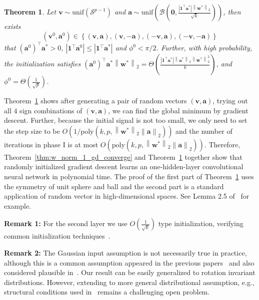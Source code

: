 \documentclass{article}
\newcommand{\poly}{\mathrm{poly}}
\newcommand{\unif}{\mathrm{unif}}
\newcommand{\firstlayer}{w}
\newcommand{\firstlayerWN}{v}
\newcommand{\secondlayer}{a}
\newcommand{\vect}[1]{\mathbf{#1}}
\newcommand{\norm}[1]{\left\|#1\right\|}
\newcommand{\abs}[1]{\left|#1\right|}
\newtheorem{thm}{Theorem}[section]
\begin{document}
\begin{thm}\label{thm:init}
Let $\vect{\firstlayerWN} \sim \unif\left(\mathcal{S}^{p-1}\right)$ and $\vect{\secondlayer} \sim \unif\left( \mathcal{B}\left(\vect{0},\frac{\abs{\vect{1}^\top\vect{\secondlayer}^*}\norm{\vect{\firstlayer}^*}_2}{\sqrt{k}}\right)\right)$, then exists \[\left(\vect{\firstlayerWN}^0,\vect{\secondlayer}^0\right) \in \left\{\left(\vect{\firstlayerWN},\vect{\secondlayer}\right), \left(\vect{\firstlayerWN},-\vect{\secondlayer}\right), \left(-\vect{\firstlayerWN},\vect{\secondlayer}\right), \left(-\vect{\firstlayerWN},-\vect{\secondlayer}\right)  \right\}\] that $\left(\vect{\secondlayer}^0\right)^\top \vect{\secondlayer}^* > 0$, $\abs{ \vect{1}^\top\vect{\secondlayer}^0}\le \abs{\vect{1}^\top \vect{\secondlayer}^*}$ and $\phi^0 <\pi/2$.
Further, with high probability, the initialization satisfies $\left(\vect{\secondlayer}^0\right)^\top \vect{\secondlayer}^*\norm{\vect{\firstlayer}^*}_2 = \Theta\left(\frac{\abs{\vect{1}^\top\vect{\secondlayer}^*}\norm{\vect{\secondlayer}^*}_2\norm{\vect{\firstlayer}^*}_2^2}{k}\right)$, and $\phi^0 = \Theta\left(\frac{1}{\sqrt{p}}\right)$.
\end{thm}
Theorem~\ref{thm:init} shows after generating a pair of random vectors $(\vect{\firstlayerWN},\vect{\secondlayer})$, trying out all $4$ sign combinations of $(\vect{\firstlayerWN},\vect{\secondlayer})$, we can find the global minimum by gradient descent.
Further, because the initial signal is not too small, we only need to set the step size to be $O(1/\poly(k,p,\norm{\vect{\firstlayer}^*}_2\norm{\vect{\secondlayer}}_2))$ and the number of iterations in phase I is at most $O(\poly(k,p,\norm{\vect{\firstlayer}^*}_2\norm{\vect{\secondlayer}}_2))$.
Therefore, Theorem~\ref{thm:w_norm_1_gd_converge} and Theorem~\ref{thm:init} together show that randomly initialized gradient descent learns an one-hidden-layer convolutional neural network in polynomial time.
The proof of the first part of Theorem~\ref{thm:init} uses the symmetry of unit sphere and ball and the second part is a standard application of random vector in high-dimensional spaces.
See Lemma 2.5 of~\citep{hardt2014noisy} for example.

\noindent\textbf{Remark 1:} For the second layer we use $O\left(\frac{1}{\sqrt{k}}\right)$ type initialization, verifying common initialization techniques~\citep{glorot2010understanding,he2015delving,lecun1998efficient}.

\noindent\textbf{Remark 2:} The Gaussian input assumption is not necessarily true in practice, although this is a common assumption appeared in the previous papers~\citep{brutzkus2017globally,li2017convergence,zhong2017learning,zhong2017recovery,tian2017analytical,xie2017diverse,shalev2017weight} and also considered plausible in~\citep{choromanska2015loss}.
Our result can be easily generalized to rotation invariant distributions.
However, extending to more general distributional assumption, e.g., structural conditions used in~\citep{du2017convolutional} remains a challenging open problem.
\end{document}

